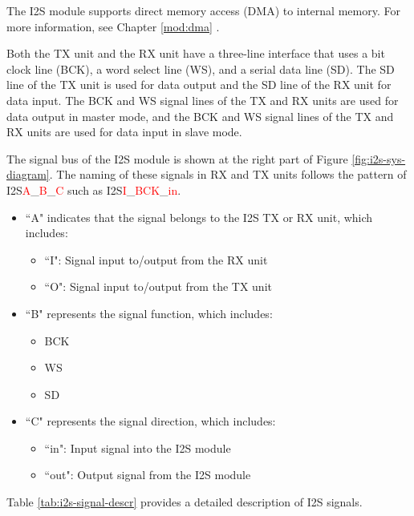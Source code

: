 \documentclass[main\_\_EN.tex]{subfiles}
\begin{document}
The I2S module supports direct memory access (DMA) to internal memory. For more information, see Chapter \ref{mod:dma} \textit{}. 

Both the TX unit and the RX unit have a three-line interface that uses a bit clock line (BCK), a word select line (WS), and a serial data line (SD). The SD line of the TX unit is used for data output and the SD line of the RX unit for data input. The BCK and WS signal lines of the TX and RX units are used for data output in master mode, and the BCK and WS signal lines of the TX and RX units are used for data input in slave mode.

The signal bus of the I2S module is shown at the right part of Figure \ref{fig:i2s-sys-diagram}. The naming of these signals in RX and TX units follows the pattern of I2S\textcolor{red}{A}\_\textcolor{red}{B}\_\textcolor{red}{C} such as I2S\textcolor{red}{I}\_\textcolor{red}{BCK}\_\textcolor{red}{in}.

\begin{itemize}
    \item ``A" indicates that the signal belongs to the I2S TX or RX unit, which includes:
    \begin{itemize}
        \item ``I": Signal input to/output from the RX unit
        \item ``O": Signal input to/output from the TX unit
    \end{itemize}
    \item ``B" represents the signal function, which includes:
    \begin{itemize}
        \item BCK
        \item WS
        \item SD
    \end{itemize}
    \item ``C" represents the signal direction, which includes:
    \begin{itemize}
        \item ``in": Input signal into the I2S module
        \item ``out": Output signal from the I2S module
    \end{itemize}
\end{itemize}

Table \ref{tab:i2s-signal-descr} provides a detailed description of I2S signals.
\end{document}
